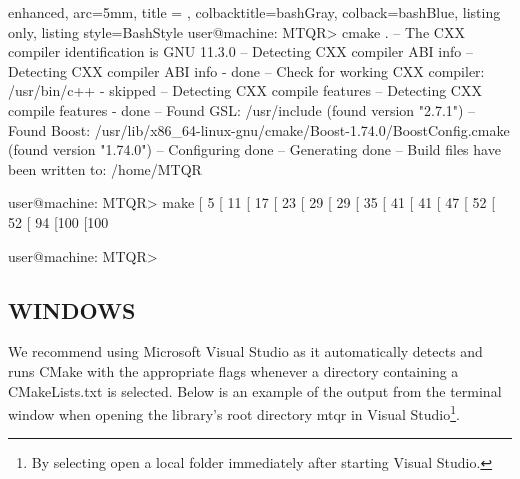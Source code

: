\documentclass[a4paper, twosided]{book}
\begin{document}
\vspace{0.2cm}
\begin{tcblisting}{enhanced,
                   arc=5mm,
                   title = \color{black}{\large \ttfamily Build using CMake},
                   colbacktitle=bashGray,
                   colback=bashBlue,
                   listing only,
                   listing style=BashStyle}
user@machine: MTQR> cmake .
-- The CXX compiler identification is GNU 11.3.0
-- Detecting CXX compiler ABI info
-- Detecting CXX compiler ABI info - done
-- Check for working CXX compiler: /usr/bin/c++ - skipped
-- Detecting CXX compile features
-- Detecting CXX compile features - done
-- Found GSL: /usr/include (found version "2.7.1") 
-- Found Boost: /usr/lib/x86_64-linux-gnu/cmake/Boost-1.74.0/BoostConfig.cmake (found version "1.74.0")  
-- Configuring done
-- Generating done
-- Build files have been written to: /home/MTQR

user@machine: MTQR> make
[  5%
[ 11%
[ 17%
[ 23%
[ 29%
[ 29%
[ 35%
[ 41%
[ 41%
[ 47%
[ 52%
[ 52%
[ 94%
[100%
[100%

user@machine: MTQR>
\end{tcblisting}

\newpage

\subsection[Windows]{\changefont WINDOWS}\label{SubSec2.3.2}

We recommend using Microsoft Visual Studio as it automatically detects and runs CMake with the appropriate flags whenever a directory containing a \colorbox{poliGrayBlue}{CMakeLists.txt} is selected. Below is an example of the output from the terminal window when opening the library's root directory \colorbox{poliGrayBlue}{mtqr} in Visual Studio\footnote{By selecting \colorbox{poliGrayBlue}{open a local folder} immediately after starting Visual Studio.}.
\end{document}
